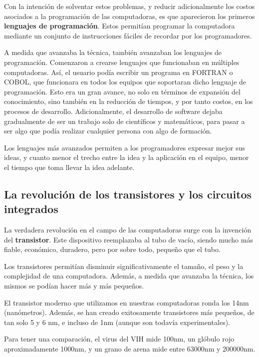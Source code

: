 Con la intención de solventar estos problemas, y reducir adicionalmente los
costos asociados a la programación de las computadoras, es que aparecieron los
primeros \textbf{lenguajes de programación}. Estos permitían programar la
computadora mediante un conjunto de instrucciones fáciles de recordar por los
programadores.\autocite[cap. 3]{ceruzzi_2003}

A medida que avanzaba la técnica, también avanzaban los lenguajes de
programación. Comenzaron a crearse lenguajes que funcionaban en múltiples
computadoras. Así, el usuario podía escribir un programa en FORTRAN o COBOL, que
funcionara en todos los equipos que soportaran dicho lenguaje de programación.
Esto era un gran avance, no solo en términos de expansión del conocimiento, sino
también en la reducción de tiempos, y por tanto costos, en los procesos de
desarrollo. Adicionalmente, el desarrollo de software dejaba gradualmente de ser
un trabajo solo de científicos y matemáticos, para pasar a ser algo que podía
realizar cualquier persona con algo de formación.

Los lenguajes más avanzados permiten a los programadores expresar mejor sus
ideas, y cuanto menor el trecho entre la idea y la aplicación en el equipo,
menor el tiempo que toma llevar la idea adelante.

\subsection{La revolución de los transistores y los circuitos integrados}
\label{chap:historia_computadoras:subsec:transistores}

La verdadera revolución en el campo de las computadoras surge con la invención
del \textbf{transistor}. Este dispositivo reemplazaba al tubo de vacío, siendo
mucho más fiable, económico, duradero, pero por sobre todo, pequeño que el tubo.

Los transistores permitían disminuir significativamente el tamaño, el peso y la
complejidad de una computadora. Además, a medida que avanzaba la técnica, los
mismos se podían hacer más y más pequeños.

\begin{knowwhat}
El transistor moderno que utilizamos en nuestras computadoras ronda los 14nm
(nanómetros). Además, se han creado exitosamente transistores más pequeños, de
tan solo 5 y 6 nm, e incluso de 1nm (aunque son todavía experimentales).

Para tener una comparación, el virus del VIH mide 100nm, un glóbulo rojo
aproximadamente 1000nm, y un grano de arena mide entre 63000nm y 200000nm.
\end{knowwhat}

